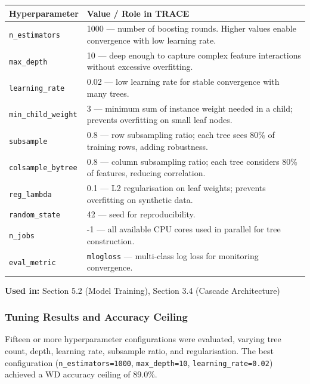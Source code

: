 \documentclass[10pt]{article}
\begin{document}
\begin{table}[h!]
\centering
\begin{tabular}{|p{4cm}|p{9cm}|}
\hline
\textbf{Hyperparameter} & \textbf{Value / Role in TRACE} \\ \hline
\texttt{n\_estimators} & 1000 --- number of boosting rounds. Higher values enable convergence with low learning rate. \\ \hline
\texttt{max\_depth} & 10 --- deep enough to capture complex feature interactions without excessive overfitting. \\ \hline
\texttt{learning\_rate} & 0.02 --- low learning rate for stable convergence with many trees. \\ \hline
\texttt{min\_child\_weight} & 3 --- minimum sum of instance weight needed in a child; prevents overfitting on small leaf nodes. \\ \hline
\texttt{subsample} & 0.8 --- row subsampling ratio; each tree sees 80\% of training rows, adding robustness. \\ \hline
\texttt{colsample\_bytree} & 0.8 --- column subsampling ratio; each tree considers 80\% of features, reducing correlation. \\ \hline
\texttt{reg\_lambda} & 0.1 --- L2 regularisation on leaf weights; prevents overfitting on synthetic data. \\ \hline
\texttt{random\_state} & 42 --- seed for reproducibility. \\ \hline
\texttt{n\_jobs} & -1 --- all available CPU cores used in parallel for tree construction. \\ \hline
\texttt{eval\_metric} & \texttt{mlogloss} --- multi-class log loss for monitoring convergence. \\ \hline
\end{tabular}
\end{table}

\textbf{Used in:} Section 5.2 (Model Training), Section 3.4 (Cascade Architecture)

\subsubsection{Tuning Results and Accuracy Ceiling}

Fifteen or more hyperparameter configurations were evaluated, varying tree count, depth, learning rate, subsample ratio, and regularisation. The best configuration (\texttt{n\_estimators=1000}, \texttt{max\_depth=10}, \texttt{learning\_rate=0.02}) achieved a WD accuracy ceiling of 89.0\%.
\end{document}
